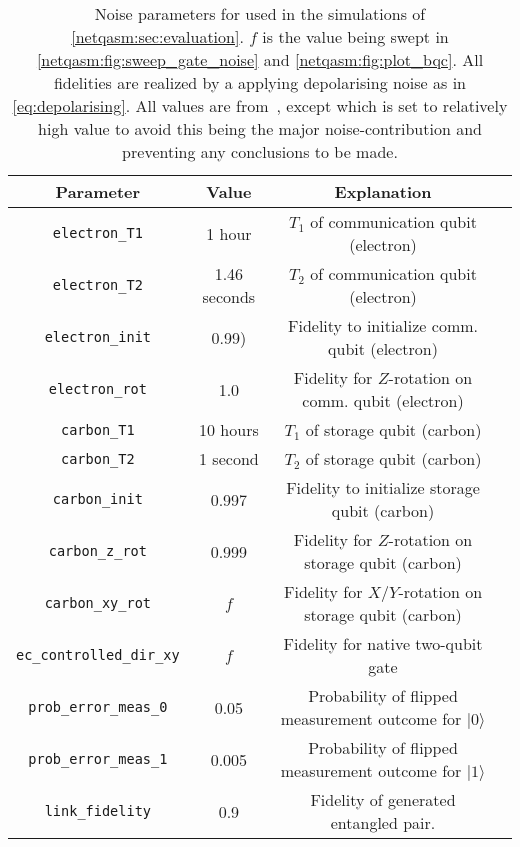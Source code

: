 \begin{table}
  \centering
  \begin{tabular}{||c|c|c|c||}
    \hline
    Parameter                 & Value        & Explanation                                                 \\
    \hline\hline
    \texttt{electron\_T1}          & 1 hour       & $T_1$ of communication qubit (electron)                     \\
    \texttt{electron\_T2}          & 1.46 seconds & $T_2$ of communication qubit (electron)                     \\
    \texttt{electron\_init}        & 0.99)        & Fidelity to initialize comm. qubit (electron)       \\
    \texttt{electron\_rot}         & 1.0          & Fidelity for $Z$-rotation on comm. qubit (electron) \\
    \texttt{carbon\_T1}            & 10 hours     & $T_1$ of storage qubit (carbon)                             \\
    \texttt{carbon\_T2}            & 1 second     & $T_2$ of storage qubit (carbon)                             \\
    \texttt{carbon\_init}          & 0.997        & Fidelity to initialize storage qubit (carbon)               \\
    \texttt{carbon\_z\_rot}         & 0.999        & Fidelity for $Z$-rotation on storage qubit (carbon)         \\
    \texttt{carbon\_xy\_rot}        & $f$          & Fidelity for $X$/$Y$-rotation on storage qubit (carbon)     \\
    \texttt{ec\_controlled\_dir\_xy} & $f$          & Fidelity for native two-qubit gate                          \\
    \texttt{prob\_error\_meas\_0}    & 0.05         & Probability of flipped measurement outcome for $|0\rangle$  \\
    \texttt{prob\_error\_meas\_1}    & 0.005        & Probability of flipped measurement outcome for $|1\rangle$  \\
    \texttt{link\_fidelity}        & 0.9          & Fidelity of generated entangled pair.                       \\
    \hline
  \end{tabular}
  \caption{
    Noise parameters for used in the simulations of \cref{netqasm:sec:evaluation}.
    $f$ is the value being swept in \cref{netqasm:fig:sweep_gate_noise} and \cref{netqasm:fig:plot_bqc}.
    All fidelities are realized by a applying depolarising noise as in \cref{eq:depolarising}.
    All values are from~\cite{coopmans2021netsquid}, except  which is set to relatively high value to avoid this being the major noise-contribution and preventing any conclusions to be made.
  }
  \label{tab:noise}
\end{table}

